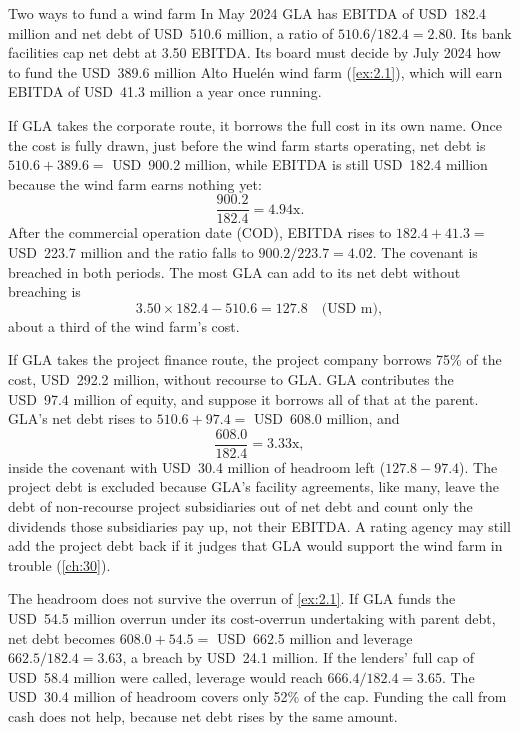 \begin{example}{Two ways to fund a wind farm \illustrative}\label{ex:2.3}
In May 2024 GLA has EBITDA of USD~182.4 million and net debt of USD~510.6 million, a ratio of $510.6 / 182.4 = 2.80$\x. Its bank facilities cap net debt at 3.50\x{} EBITDA. Its board must decide by July 2024 how to fund the USD~389.6 million Alto Huelén wind farm (\cref{ex:2.1}), which will earn EBITDA of USD~41.3 million a year once running.

If GLA takes the corporate route, it borrows the full cost in its own name. Once the cost is fully drawn, just before the wind farm starts operating, net debt is $510.6 + 389.6 = $ USD~900.2 million, while EBITDA is still USD~182.4 million because the wind farm earns nothing yet:
\begin{equation*}
\frac{900.2}{182.4} = 4.94\text{x}.
\end{equation*}
After the commercial operation date (COD), EBITDA rises to $182.4 + 41.3 = $ USD~223.7 million and the ratio falls to $900.2 / 223.7 = 4.02$\x. The covenant is breached in both periods. The most GLA can add to its net debt without breaching is
\begin{equation*}
3.50 \times 182.4 - 510.6 = 127.8 \quad \text{(USD m)},
\end{equation*}
about a third of the wind farm's cost.

If GLA takes the project finance route, the project company borrows 75\% of the cost, USD~292.2 million, without recourse to GLA. GLA contributes the USD~97.4 million of equity, and suppose it borrows all of that at the parent. GLA's net debt rises to $510.6 + 97.4 = $ USD~608.0 million, and
\begin{equation*}
\frac{608.0}{182.4} = 3.33\text{x},
\end{equation*}
inside the covenant with USD~30.4 million of headroom left ($127.8 - 97.4$). The project debt is excluded because GLA's facility agreements, like many, leave the debt of non-recourse project subsidiaries out of net debt and count only the dividends those subsidiaries pay up, not their EBITDA. A rating agency may still add the project debt back if it judges that GLA would support the wind farm in trouble (\cref{ch:30}).

The headroom does not survive the overrun of \cref{ex:2.1}. If GLA funds the USD~54.5 million overrun under its cost-overrun undertaking with parent debt, net debt becomes $608.0 + 54.5 = $ USD~662.5 million and leverage $662.5 / 182.4 = 3.63$\x, a breach by USD~24.1 million. If the lenders' full cap of USD~58.4 million were called, leverage would reach $666.4 / 182.4 = 3.65$\x. The USD~30.4 million of headroom covers only 52\% of the cap. Funding the call from cash does not help, because net debt rises by the same amount.


\end{example}
